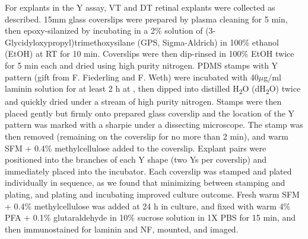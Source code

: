 For explants in the Y assay, VT and DT retinal explants were collected as described.
15mm glass coverslips were prepared by plasma cleaning for 5 min, then epoxy-silanized by incubating in a 2\% solution of (3-Glycidyloxypropyl)trimethoxysilane (GPS, Sigma-Aldrich) in 100\% ethanol (EtOH) at RT for 10 min.
Coverslips were then dip-rinsed in 100\% EtOH twice for 5 min each and dried using high purity nitrogen.
PDMS stamps with Y pattern (gift from F. Fiederling and F. Weth) were incubated with 40$\mu$g/ml laminin solution for at least 2 h at , then dipped into distilled H\textsubscript{2}O (dH\textsubscript{2}O) twice and quickly dried under a stream of high purity nitrogen.
Stamps were then placed gently but firmly onto prepared glass coverslip and the location of the Y pattern was marked with a sharpie under a dissecting microscope.
The stamp was then removed (remaining on the coverslip for no more than 2 min), and warm SFM + 0.4\% methylcellulose added to the coverslip.
Explant pairs were positioned into the branches of each Y shape (two Ys per coverslip) and immediately placed into the incubator.
Each coverslip was stamped and plated individually in sequence, as we found that minimizing between stamping and plating, and plating and incubating improved culture outcome.
Fresh warm SFM + 0.4\% methylcellulose was added at 24 h in culture, and fixed with warm 4\% PFA + 0.1\% glutaraldehyde in 10\% sucrose solution in 1X PBS for 15 min, and then immunostained for laminin and NF, mounted, and imaged.